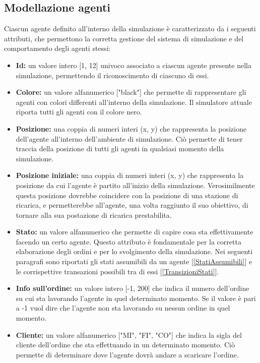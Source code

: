 \documentclass[12pt]{article}
\begin{document}
\subsection{Modellazione agenti}
Ciascun agente definito all'interno della simulazione è caratterizzato da i seguenti attributi, che permettono la corretta gestione del sistema di simulazione e del comportamento degli agenti stessi:
\begin{itemize}
\item \textbf{Id:} un valore intero [1, 12] univoco associato a ciascun agente presente nella simulazione, permettendo il riconoscimento di ciascuno di essi.
\item \textbf{Colore:} un valore alfanumerico ["black"] che permette di rappresentare gli agenti con colori differenti all'interno della simulazione. Il simulatore attuale riporta tutti gli agenti con il colore nero.
\item \textbf{Posizione:} una coppia di numeri interi (x, y) che rappresenta la posizione dell'agente all'interno dell'ambiente di simulazione. Ciò permette di tener traccia della posizione di tutti gli agenti in qualsiasi momento della simulazione.
\item \textbf{Posizione iniziale:} una coppia di numeri interi (x, y) che rappresenta la posizione da cui l'agente è partito all'inizio della simulazione. Verosimilmente questa posizione dovrebbe coincidere con la posizione di una stazione di ricarica, e permetterebbe all'agente, una volta raggiunto il suo obiettivo, di tornare alla sua postazione di ricarica prestabilita. 
\item \textbf{Stato:} un valore alfanumerico che permette di capire cosa sta effettivamente facendo un certo agente. Questo attributo è fondamentale per la corretta elaborazione degli ordini e per lo svolgimento della simulazione. Nei seguenti paragrafi sono riportati gli stati assumibili da un agente [\ref{StatiAssumibili}] e le corrispettive transazioni possibili tra di essi [\ref{TransizioniStati}].
\item \textbf{Info sull'ordine:} un valore intero [-1, 200] che indica il numero dell'ordine su cui sta lavorando l'agente in quel determinato momento. Se il valore è pari a -1 vuol dire che l'agente non sta lavorando su nessun ordine in quel momento.
\item \textbf{Cliente:} un valore alfanumerico ["MI", "FI", "CO"] che indica la sigla del cliente dell'ordine che sta effettuando in un determinato momento. Ciò permette di determinare dove l'agente dovrà andare a scaricare l'ordine.

\end{itemize}
\end{document}
